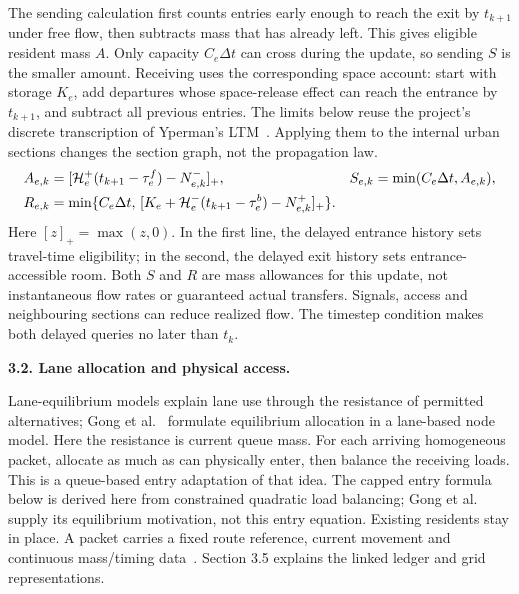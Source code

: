 \documentclass[10pt,a4paper]{article}
\newcommand{\pos}[1]{[#1]_+}
\begin{document}
The sending calculation first counts entries early enough to reach the
exit by $t_{k+1}$ under free flow, then subtracts mass that has already
left. This gives eligible resident mass $A$. Only capacity $C_e\Delta t$
can cross during the update, so sending $S$ is the smaller amount.
Receiving uses the corresponding space account: start with storage
$K_e$, add departures whose space-release effect can reach the entrance
by $t_{k+1}$, and subtract all previous entries.
The limits below reuse the project's discrete transcription of Yperman's LTM~\cite{m0}.
Applying them to the internal urban sections changes the section graph,
not the propagation law.
\begin{align}
 A_{e,k}&=\pos{{\cal H}^+_e(t_{k+1}-\tau^f_e)-N^-_{e,k}},
 &S_{e,k}&=\min(C_e\Delta t,A_{e,k}),\label{eq:compact-sending}\\
 R_{e,k}&=\min\{C_e\Delta t,\,
 \pos{K_e+{\cal H}^-_e(t_{k+1}-\tau^b_e)-N^+_{e,k}}\}.
 \label{eq:compact-receiving}
\end{align}
Here $[z]_+=\max(z,0)$. In the first line, the delayed entrance history
sets travel-time eligibility; in the second, the delayed exit history
sets entrance-accessible room. Both $S$ and $R$ are mass allowances for
this update, not instantaneous flow rates or guaranteed actual transfers.
Signals, access and neighbouring sections can reduce realized flow.
The timestep condition makes both delayed queries no later than $t_k$.

\textbf{3.2. Lane allocation and physical access.}

Lane-equilibrium models explain lane use through the resistance of
permitted alternatives; Gong et al.~\cite{gong} formulate equilibrium
allocation in a lane-based node model. Here the resistance is
current queue mass. For each arriving homogeneous packet, allocate as much
as can physically enter, then balance the receiving loads. This is a
queue-based entry adaptation of that idea.
The capped entry formula below is derived here from constrained quadratic load balancing; Gong et al.~\cite{gong} supply its equilibrium motivation, not this entry equation. Existing residents stay in place. A packet carries a fixed
route reference, current movement and continuous mass/timing data~\cite{m1}.
Section 3.5 explains the linked ledger and grid representations.
\par
\end{document}
